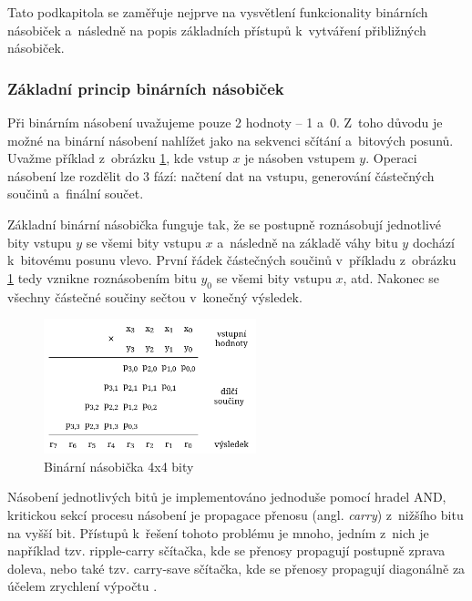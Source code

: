 Tato podkapitola se zaměřuje nejprve na vysvětlení funkcionality binárních násobiček a~následně na popis základních přístupů k~vytváření přibližných násobiček.

\subsubsection{Základní princip binárních násobiček}
Při binárním násobení uvažujeme pouze 2 hodnoty -- 1 a~0. Z~toho důvodu je možné na binární násobení nahlížet jako na sekvenci sčítání a~bitových posunů. Uvažme příklad z~obrázku \ref{fig:binmult}, kde vstup $x$ je násoben vstupem $y$. Operaci násobení lze rozdělit do 3 fází: načtení dat na vstupu, generování částečných součinů a~finální součet.

Základní binární násobička funguje tak, že se postupně roznásobují jednotlivé bity vstupu $y$ se všemi bity vstupu $x$ a~následně na základě váhy bitu $y$ dochází k~bitovému posunu vlevo. První řádek částečných součinů v~příkladu z~obrázku \ref{fig:binmult} tedy vznikne roznásobením bitu $y_0$ se všemi bity vstupu $x$, atd. Nakonec se všechny částečné součiny sečtou v~konečný výsledek.

\begin{figure}[H]
    \centering
    \includegraphics[width=0.55\textwidth]{obrazky-figures/binmult.png}
    \caption{Binární násobička 4x4 bity}
    \label{fig:binmult}
\end{figure}

Násobení jednotlivých bitů je implementováno jednoduše pomocí hradel AND, kritickou sekcí procesu násobení je propagace přenosu (angl. \textit{carry}) z~nižšího bitu na vyšší bit. Přístupů k~řešení tohoto problému je mnoho, jedním z~nich je například tzv. ripple-carry sčítačka, kde se přenosy propagují postupně zprava doleva, nebo také tzv. carry-save sčítačka, kde se přenosy propagují diagonálně za účelem zrychlení výpočtu \cite{approx_mult_survey}.

